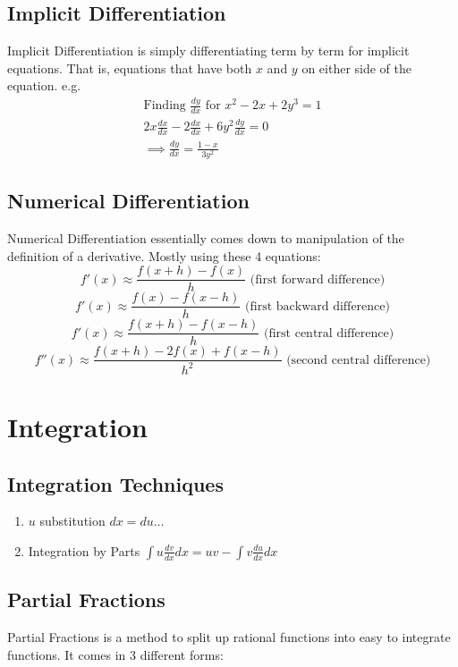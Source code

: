 \documentclass[12pt] {article}
\begin{document}
\subsection*{Implicit Differentiation}
Implicit Differentiation is simply differentiating term by term for implicit equations.
That is, equations that have both $x$ and $y$ on either side of the equation. e.g.
\begin{gather*}
  \text{Finding } \frac{dy}{dx} \text{ for } x^2-2x+2y^3=1 \\
  2x\frac{dx}{dx} -2\frac{dx}{dx} +6y^2\frac{dy}{dx}=0 \\
  \implies \frac{dy}{dx} = \frac{1-x}{3y^2}
\end{gather*}
\subsection*{Numerical Differentiation}
Numerical Differentiation essentially comes down to manipulation of the definition of a derivative. Mostly using these 4 equations:
\begin{equation*}
  f'(x) \approx \frac{f(x+h)-f(x)}{h} \text{ (first forward difference)}
\end{equation*}
\begin{equation*}
  f'(x) \approx \frac{f(x)-f(x-h)}{h} \text{ (first backward difference)}
\end{equation*}
\begin{equation*}
  f'(x) \approx \frac{f(x+h)-f(x-h)}{h} \text{ (first central difference)}
\end{equation*}
\begin{equation*}
  f''(x) \approx \frac{f(x+h)-2f(x)+f(x-h)}{h^2} \text{ (second central difference)}
\end{equation*}
\section{Integration}
\subsection*{Integration Techniques}
\begin{enumerate}
  \item $u$ substitution $dx=du\dotsc$
  \item Integration by Parts $\int u \frac{dv}{dx} dx = uv - \int v \frac{du}{dx}dx$
\end{enumerate}
\subsection*{Partial Fractions}
Partial Fractions is a method to split up rational functions into easy to integrate functions. 
It comes in 3 different forms:
\end{document}
